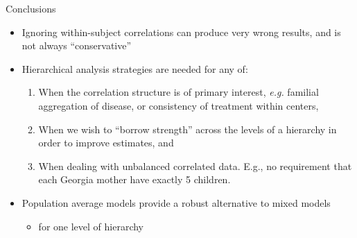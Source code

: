 \documentclass[
  ignorenonframetext,
]{beamer}
\providecommand{\tightlist}{%
  \setlength{\itemsep}{0pt}\setlength{\parskip}{0pt}}
\begin{document}
\begin{frame}{Conclusions}
\protect\hypertarget{conclusions}{}

\begin{itemize}
\tightlist
\item
  Ignoring within-subject correlations can produce very wrong results,
  and is not always ``conservative''
\item
  Hierarchical analysis strategies are needed for any of:

  \begin{enumerate}
  \tightlist
  \item
    When the correlation structure is of primary interest, \emph{e.g.}
    familial aggregation of disease, or consistency of treatment within
    centers,
  \item
    When we wish to ``borrow strength'' across the levels of a hierarchy
    in order to improve estimates, and
  \item
    When dealing with unbalanced correlated data. E.g., no requirement
    that each Georgia mother have exactly 5 children.
  \end{enumerate}
\item
  Population average models provide a robust alternative to mixed models

  \begin{itemize}
  \tightlist
  \item
    for one level of hierarchy
  \end{itemize}
\end{itemize}

\end{frame}
\end{document}
